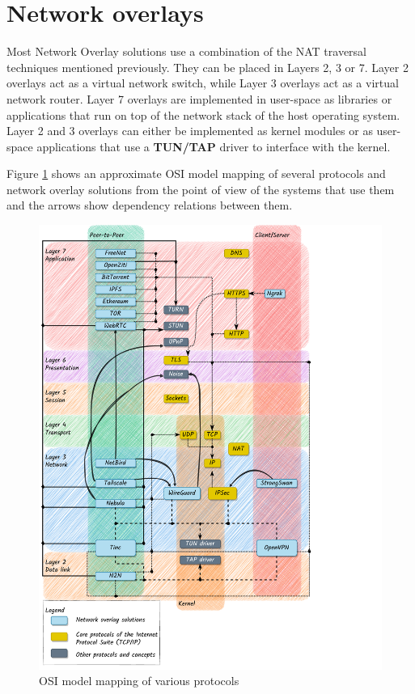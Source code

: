 \hypertarget{thesis__020-related-work.md__network-overlays}{%
\section{Network
overlays}\label{thesis__020-related-work.md__network-overlays}}

Most Network Overlay solutions use a combination of the NAT traversal
techniques mentioned previously. They can be placed in Layers 2, 3 or 7.
Layer 2 overlays act as a virtual network switch, while Layer 3 overlays
act as a virtual network router. Layer 7 overlays are implemented in
user-space as libraries or applications that run on top of the network
stack of the host operating system. Layer 2 and 3 overlays can either be
implemented as kernel modules or as user-space applications that use a
\textbf{TUN/TAP} driver to interface with the kernel.

Figure \ref{osi-map-overlays} shows an approximate OSI model mapping of
several protocols and network overlay solutions from the point of view
of the systems that use them and the arrows show dependency relations
between them.

\begin{figure}
\centering
\includegraphics[width=\textwidth,height=0.9\textheight]{thesis/../figures/osi-map-overlays.drawio.pdf}
\caption{OSI model mapping of various protocols
\label{osi-map-overlays}}
\end{figure}

